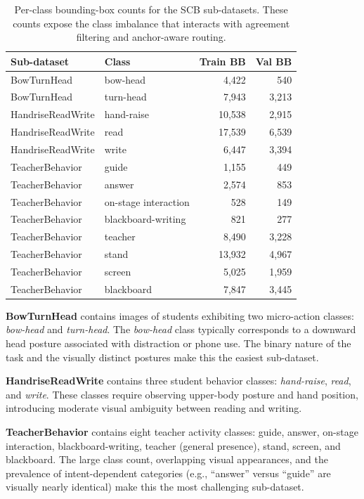 \documentclass[10pt,letterpaper]{article}
\begin{document}
\begin{table}[H]
\caption{Per-class bounding-box counts for the SCB sub-datasets.
These counts expose the class imbalance that interacts with agreement
filtering and anchor-aware routing.}
\label{tab:class_balance}
\centering
\begin{tabular}{llrr}
\toprule
\textbf{Sub-dataset} & \textbf{Class} & \textbf{Train BB} & \textbf{Val BB} \\
\midrule
BowTurnHead & bow-head & 4{,}422 & 540 \\
BowTurnHead & turn-head & 7{,}943 & 3{,}213 \\
HandriseReadWrite & hand-raise & 10{,}538 & 2{,}915 \\
HandriseReadWrite & read & 17{,}539 & 6{,}539 \\
HandriseReadWrite & write & 6{,}447 & 3{,}394 \\
TeacherBehavior & guide & 1{,}155 & 449 \\
TeacherBehavior & answer & 2{,}574 & 853 \\
TeacherBehavior & on-stage interaction & 528 & 149 \\
TeacherBehavior & blackboard-writing & 821 & 277 \\
TeacherBehavior & teacher & 8{,}490 & 3{,}228 \\
TeacherBehavior & stand & 13{,}932 & 4{,}967 \\
TeacherBehavior & screen & 5{,}025 & 1{,}959 \\
TeacherBehavior & blackboard & 7{,}847 & 3{,}445 \\
\bottomrule
\end{tabular}
\end{table}

\textbf{BowTurnHead} contains images of students exhibiting two
micro-action classes: \textit{bow-head} and \textit{turn-head}.
The \textit{bow-head} class typically corresponds to a downward head
posture associated with distraction or phone use.
The binary nature of the task and the visually distinct postures make
this the easiest sub-dataset.

\textbf{HandriseReadWrite} contains three student behavior classes:
\textit{hand-raise}, \textit{read}, and \textit{write}.
These classes require observing upper-body posture and hand position,
introducing moderate visual ambiguity between reading and writing.

\textbf{TeacherBehavior} contains eight teacher activity classes:
guide, answer, on-stage interaction, blackboard-writing, teacher
(general presence), stand, screen, and
blackboard.
The large class count, overlapping visual appearances, and the
prevalence of intent-dependent categories (e.g., ``answer'' versus
``guide'' are visually nearly identical) make this the most
challenging sub-dataset.
\end{document}
